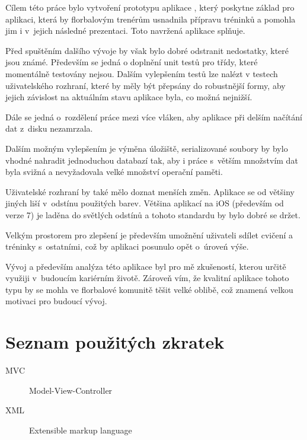 \documentclass[thesis=B,czech]{FITthesis}[2012/06/26]
\begin{document}
\begin{conclusion}
	Cílem této práce bylo vytvoření prototypu aplikace , který poskytne základ pro aplikaci, která by florbalovým trenérům usnadnila přípravu tréninků a pomohla jim i v~jejich následné prezentaci. Toto navržená aplikace splňuje.

	Před spuštěním dalšího vývoje by však bylo dobré odstranit nedostatky, které jsou známé. Především se jedná o doplnění unit testů pro třídy, které momentálně testovány nejsou. Dalším vylepšením testů lze nalézt v testech uživatelského rozhraní, které by měly být přepsány do robustnější formy, aby jejich závislost na aktuálním stavu aplikace byla, co možná nejnižší.

	Dále se jedná o~rozdělení práce mezi více vláken, aby aplikace při delším načítání dat z~disku nezamrzala.

	Dalším možným vylepšením je výměna úložiště, serializované soubory by bylo vhodné nahradit jednoduchou databazí tak, aby i práce s~větším množstvím dat byla svižná a nevyžadovala velké množství operační paměti.

	Uživatelské rozhraní by také mělo doznat menších změn. Aplikace se od většiny jiných liší v~odstínu použitých barev. Většina aplikací na iOS (především od verze 7) je laděna do světlých odstínů a tohoto standardu by bylo dobré se držet.

	Velkým prostorem pro zlepšení je především umožnění uživateli sdílet cvičení a tréninky s~ostatními, což by aplikaci posunulo opět o~úroveń výše.

	Vývoj a především analýza této aplikace byl pro mě zkušeností, kterou určitě využiji v~budoucím kariérním životě. Zároveň vím, že kvalitní aplikace tohoto typu by se mohla ve florbalové komunitě těšit velké oblibě, což znamená velkou motivaci pro budoucí vývoj.
\end{conclusion}




\appendix

\chapter{Seznam použitých zkratek}
\begin{description}
	\item[MVC] Model-View-Controller
	\item[XML] Extensible markup language
\end{description}
\end{document}

